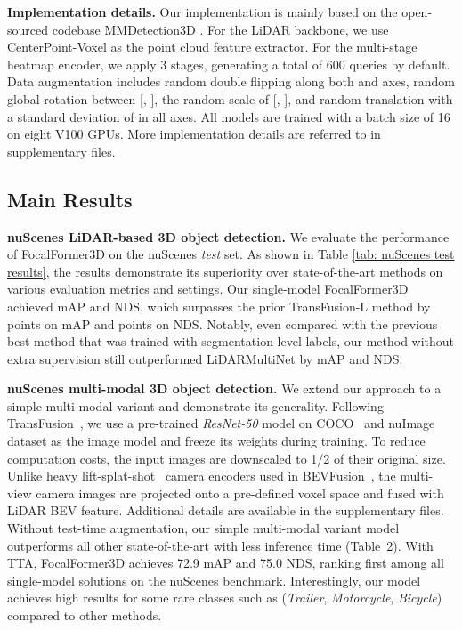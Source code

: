 \documentclass[10pt,twocolumn,letterpaper]{article}
\begin{document}
\vspace{1mm}
\noindent\textbf{Implementation details.}
Our implementation is mainly based on the open-sourced codebase MMDetection3D \cite{mmdet3d2020}. For the LiDAR backbone, we use CenterPoint-Voxel as the point cloud feature extractor. For the multi-stage heatmap encoder, we apply 3 stages, generating a total of 600 queries by default. Data augmentation includes random double flipping along both  and  axes, random global rotation between [, ], the random scale of [, ], and random translation with a standard deviation of  in all axes. All models are trained with a batch size of 16 on eight V100 GPUs. More implementation details are referred to in supplementary files.



\subsection{Main Results}
\noindent\textbf{nuScenes LiDAR-based 3D object detection.}
We evaluate the performance of FocalFormer3D on the nuScenes \textit{test} set. As shown in Table \ref{tab: nuScenes test results}, the results demonstrate its superiority over state-of-the-art methods on various evaluation metrics and settings. Our single-model FocalFormer3D achieved  mAP and  NDS, which surpasses the prior TransFusion-L method by  points on mAP and  points on NDS. Notably, even compared with the previous best method that was trained with segmentation-level labels, our method without extra supervision still outperformed LiDARMultiNet by  mAP and  NDS. 

\vspace{2mm}
\noindent\textbf{nuScenes multi-modal 3D object detection.} We extend our approach to a simple multi-modal variant and demonstrate its generality. Following TransFusion~\cite{transfusion}, we use a pre-trained \textit{ResNet-50} model on COCO~\cite{coco} and nuImage~\cite{nuscenes} dataset as the image model and freeze its weights during training. To reduce computation costs, the input images are downscaled to 1/2 of their original size. Unlike heavy lift-splat-shot~\cite{liftsplatshoot} camera encoders used in BEVFusion~\cite{bevfusion, bevfusionmit}, the multi-view camera images are projected onto a pre-defined voxel space and fused with LiDAR BEV feature. Additional details are available in the supplementary files. Without test-time augmentation, our simple multi-modal variant model outperforms all other state-of-the-art with less inference time (Table~2). With TTA, FocalFormer3D achieves 72.9 mAP and 75.0 NDS, ranking first among all single-model solutions on the nuScenes benchmark. Interestingly, our model achieves high results for some rare classes such as (\textsl{Trailer}, \textsl{Motorcycle}, \textsl{Bicycle}) compared to other methods.
\end{document}
